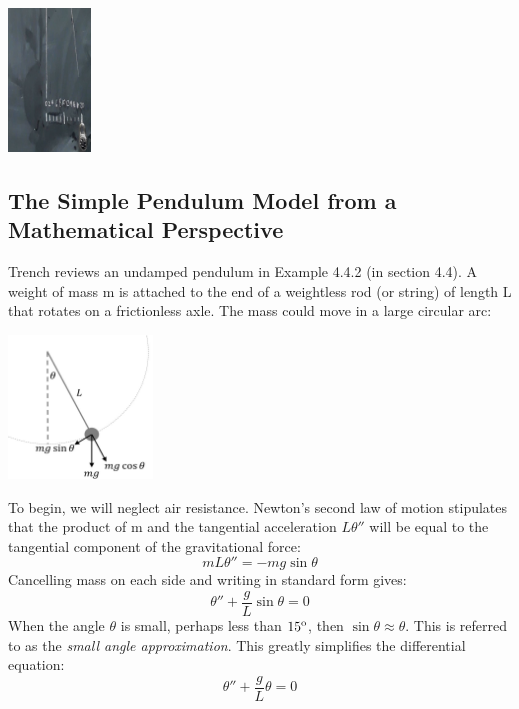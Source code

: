 \documentclass{ximera}
\begin{document}
\begin{image}
 \includegraphics[height=1.5in]{pendulumLock.jpg}
\end{image}

\subsection*{The Simple Pendulum Model from a Mathematical Perspective}

Trench reviews an undamped pendulum in Example 4.4.2 (in section 4.4).  A weight of mass m is attached to the end of a weightless rod (or string) of length L that rotates on a frictionless axle.  The mass could move in a large circular arc:

\begin{image}
 \includegraphics[height=1.5in]{pendulumswing.jpg}
\end{image}

To begin, we will neglect air resistance.  Newton’s second law of motion stipulates that the product of m and the tangential acceleration $L\theta''$ will be equal to the tangential component of the gravitational force:
$$mL\theta''=-mg \sin\theta $$
Cancelling mass on each side and writing in standard form gives:
$$\theta ''+\frac{g}{L} \sin\theta=0$$
When the angle $\theta$ is small, perhaps less than $15^{\text o}$, then $\sin \theta\approx \theta$. 
This is referred to as the \emph{small angle approximation}. This greatly simplifies the differential equation:
\begin{equation}\label{eq:simplePend1}\theta''+\frac{g}{L}\theta=0\end{equation}
\end{document}
